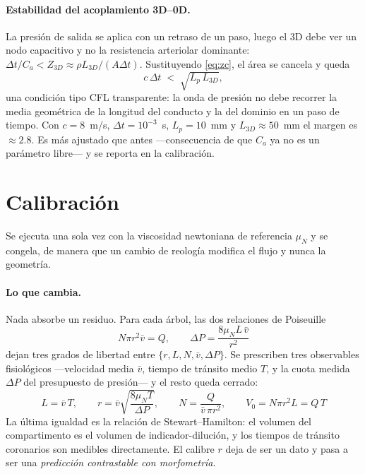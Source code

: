 \documentclass[11pt]{article}
\begin{document}
\paragraph{Estabilidad del acoplamiento 3D--0D.} La presi\'on de salida se
aplica con un retraso de un paso, luego el 3D debe ver un nodo capacitivo y no
la resistencia arteriolar dominante: $\Delta t/C_a<Z_{3D}\approx\rho L_{3D}/(A\Delta t)$.
Sustituyendo \eqref{eq:zc}, el \'area se cancela y queda
\begin{equation}
  c\,\Delta t\;<\;\sqrt{L_p\,L_{3D}} ,
  \label{eq:estab}
\end{equation}
una condici\'on tipo CFL transparente: la onda de presi\'on no debe recorrer la
media geom\'etrica de la longitud del conducto y la del dominio en un paso de
tiempo. Con $c=8$~m/s, $\Delta t=10^{-3}$~s, $L_p=10$~mm y $L_{3D}\approx50$~mm
el margen es $\approx2.8$. Es m\'as ajustado que antes ---consecuencia de que
$C_a$ ya no es un par\'ametro libre--- y se reporta en la calibraci\'on.

\section{Calibraci\'on}
\label{sec:calib}

Se ejecuta una sola vez con la viscosidad newtoniana de referencia $\mu_N$ y se
congela, de manera que un cambio de reolog\'ia modifica el flujo y nunca la
geometr\'ia.

\paragraph{Lo que cambia.} Nada absorbe un residuo. Para cada \'arbol, las dos
relaciones de Poiseuille
\begin{equation}
  N\pi r^{2}\bar v = Q,
  \qquad
  \Delta P=\frac{8\mu_N L\,\bar v}{r^{2}}
  \label{eq:cierre}
\end{equation}
dejan tres grados de libertad entre $\{r,L,N,\bar v,\Delta P\}$. Se prescriben
tres observables fisiol\'ogicos ---velocidad media $\bar v$, tiempo de
tr\'ansito medio $T$, y la cuota medida $\Delta P$ del presupuesto de
presi\'on--- y el resto queda cerrado:
\begin{equation}
  \boxed{\;
  L=\bar v\,T,
  \qquad
  r=\bar v\sqrt{\frac{8\mu_N T}{\Delta P}},
  \qquad
  N=\frac{Q}{\bar v\,\pi r^{2}},
  \qquad
  V_0=N\pi r^{2}L=Q\,T\;}
  \label{eq:calib}
\end{equation}
La \'ultima igualdad es la relaci\'on de Stewart--Hamilton: el volumen del
compartimento es el volumen de indicador-diluci\'on, y los tiempos de
tr\'ansito coronarios son medibles directamente. El calibre $r$ deja de ser un
dato y pasa a ser una \emph{predicci\'on contrastable con morfometr\'ia}.
\end{document}
